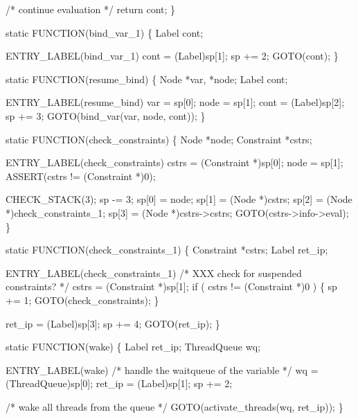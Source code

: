     /* continue evaluation */
    return cont;
\}

static
FUNCTION(bind_var_1)
\{
    Label cont;

 ENTRY_LABEL(bind_var_1)
    cont = (Label)sp[1];
    sp  += 2;
    GOTO(cont);
\}

static
FUNCTION(resume_bind)
\{
    Node  *var, *node;
    Label cont;

 ENTRY_LABEL(resume_bind)
    var  = sp[0];
    node = sp[1];
    cont = (Label)sp[2];
    sp  += 3;
    GOTO(bind_var(var, node, cont));
\}

static
FUNCTION(check_constraints)
\{
    Node       *node;
    Constraint *cstrs;

 ENTRY_LABEL(check_constraints)
    cstrs = (Constraint *)sp[0];
    node  = sp[1];
    ASSERT(cstrs != (Constraint *)0);

    CHECK_STACK(3);
    sp   -= 3;
    sp[0] = node;
    sp[1] = (Node *)cstrs;
    sp[2] = (Node *)check_constraints_1;
    sp[3] = (Node *)cstrs->cstrs;
    GOTO(cstrs->info->eval);
\}

static
FUNCTION(check_constraints_1)
\{
    Constraint *cstrs;
    Label      ret_ip;

 ENTRY_LABEL(check_constraints_1)
    /* XXX check for suspended constraints? */
    cstrs = (Constraint *)sp[1];
    if ( cstrs != (Constraint *)0 )
    \{
        sp += 1;
        GOTO(check_constraints);
    \}

    ret_ip = (Label)sp[3];
    sp    += 4;
    GOTO(ret_ip);
\}

static
FUNCTION(wake)
\{
    Label       ret_ip;
    ThreadQueue wq;

 ENTRY_LABEL(wake)
    /* handle the waitqueue of the variable */
    wq     = (ThreadQueue)sp[0];
    ret_ip = (Label)sp[1];
    sp    += 2;

    /* wake all threads from the queue */
    GOTO(activate_threads(wq, ret_ip));
\}
\nwendcode{}

%
%

